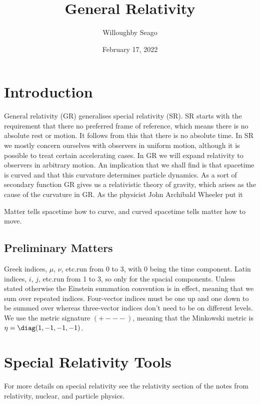 \documentclass[fleqn]{NotesClass}
\title{General Relativity}
\author{Willoughby Seago}
\date{February 17, 2022}
\begin{document}
    \frontmatter
    \titlepage
    \tableofcontents
    \listoffigures
    \mainmatter
    \chapter{Introduction}
    General relativity (GR) generalises special relativity (SR).
    SR starts with the requirement that there no preferred frame of reference, which means there is no absolute rest or motion.
    It follows from this that there is no absolute time.
    In SR we mostly concern ourselves with observers in uniform motion, although it is possible to treat certain accelerating cases.
    In GR we will expand relativity to observers in arbitrary motion.
    An implication that we shall find is that spacetime is curved and that this curvature determines particle dynamics.
    As a sort of secondary function GR gives us a relativistic theory of gravity, which arises as the cause of the curvature in GR.
    As the physicist John Archibald Wheeler put it
    \begin{displayquote}
        Matter tells spacetime how to curve, and curved spacetime tells matter how to move.
    \end{displayquote}

    \section{Preliminary Matters}
    Greek indices, \(\mu\), \(\nu\), etc.\@ run from 0 to 3, with 0 being the time component.
    Latin indices, \(i\), \(j\), etc.\@ run from 1 to 3, so only for the spacial components.
    Unless stated otherwise the Einstein summation convention is in effect, meaning that we sum over repeated indices.
    Four-vector indices must be one up and one down to be summed over whereas three-vector indices don't need to be on different levels.
    We use the metric signature \(({+}{-}{-}{-})\), meaning that the Minkowski metric is \(\eta = \diag(1, -1, -1, -1)\).
    
    \chapter{Special Relativity Tools}
    \begin{rmk}
        For more details on special relativity see the relativity section of the notes from relativity, nuclear, and particle physics.
    \end{rmk}
\end{document}

